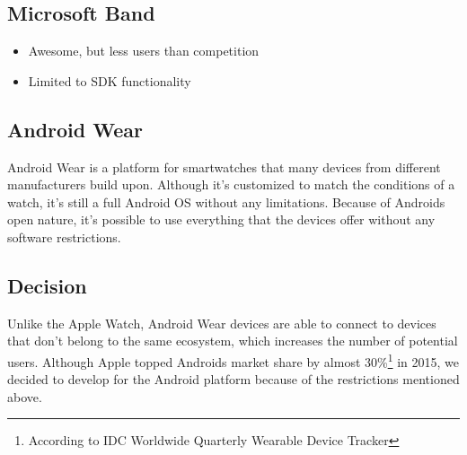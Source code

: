 \subsection{Microsoft Band}
\begin{itemize}[noitemsep]
	\item Awesome, but less users than competition
	\item Limited to SDK functionality
\end{itemize}

\subsection{Android Wear}
Android Wear is a platform for smartwatches that many devices from different manufacturers build upon.
Although it's customized to match the conditions of a watch, it's still a full Android OS without any limitations.
Because of Androids open nature, it's possible to use everything that the devices offer without any software restrictions.

\subsection{Decision}

Unlike the Apple Watch, Android Wear devices are able to connect to devices that don't belong to the same ecosystem, which increases the number of potential users. Although Apple topped Androids market share by almost 30\%\footnote{According to IDC Worldwide Quarterly Wearable Device Tracker} in 2015, we decided to develop for the Android platform because of the restrictions mentioned above.

\clearpage